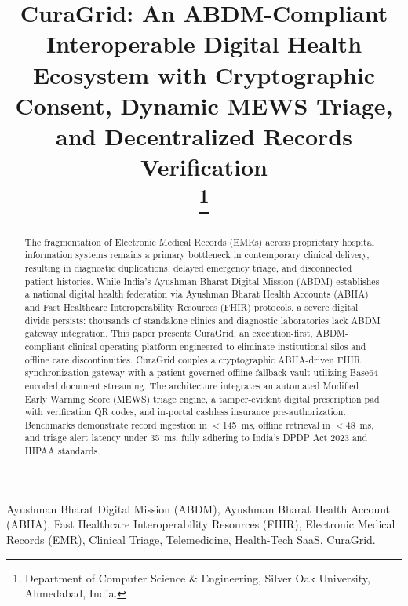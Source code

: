\documentclass[conference]{IEEEtran}
\begin{document}
\title{CuraGrid: An ABDM-Compliant Interoperable Digital Health Ecosystem with Cryptographic Consent, Dynamic MEWS Triage, and Decentralized Records Verification\\
\thanks{Department of Computer Science \& Engineering, Silver Oak University, Ahmedabad, India.}
}

\author{
}

\maketitle

\begin{abstract}
The fragmentation of Electronic Medical Records (EMRs) across proprietary hospital information systems remains a primary bottleneck in contemporary clinical delivery, resulting in diagnostic duplications, delayed emergency triage, and disconnected patient histories. While India's Ayushman Bharat Digital Mission (ABDM) establishes a national digital health federation via Ayushman Bharat Health Accounts (ABHA) and Fast Healthcare Interoperability Resources (FHIR) protocols, a severe digital divide persists: thousands of standalone clinics and diagnostic laboratories lack ABDM gateway integration. This paper presents CuraGrid, an execution-first, ABDM-compliant clinical operating platform engineered to eliminate institutional silos and offline care discontinuities. CuraGrid couples a cryptographic ABHA-driven FHIR synchronization gateway with a patient-governed offline fallback vault utilizing Base64-encoded document streaming. The architecture integrates an automated Modified Early Warning Score (MEWS) triage engine, a tamper-evident digital prescription pad with verification QR codes, and in-portal cashless insurance pre-authorization. Benchmarks demonstrate record ingestion in $<$145~ms, offline retrieval in $<$48~ms, and triage alert latency under 35~ms, fully adhering to India's DPDP Act 2023 and HIPAA standards.
\end{abstract}

\begin{IEEEkeywords}
Ayushman Bharat Digital Mission (ABDM), Ayushman Bharat Health Account (ABHA), Fast Healthcare Interoperability Resources (FHIR), Electronic Medical Records (EMR), Clinical Triage, Telemedicine, Health-Tech SaaS, CuraGrid.
\end{IEEEkeywords}
\end{document}
